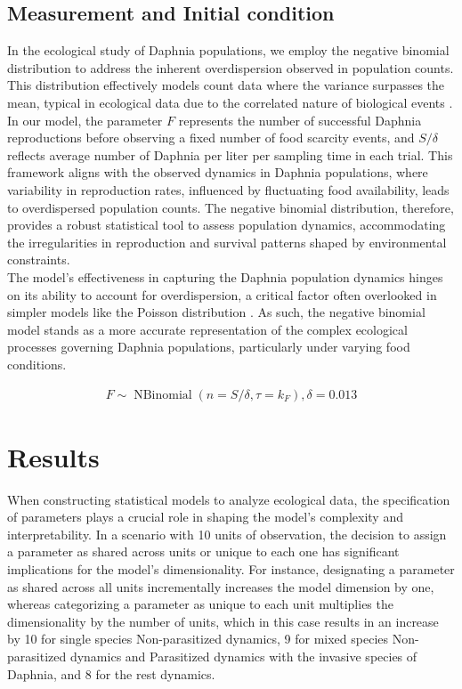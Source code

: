 \documentclass[12pt]{article}
\begin{document}
\subsection{Measurement and Initial condition}
In the ecological study of Daphnia populations, we employ the negative binomial distribution to address the inherent overdispersion observed in population counts. This distribution effectively models count data where the variance surpasses the mean, typical in ecological data due to the correlated nature of biological events \citep{ning2021systemic}. In our model, the parameter $F$ represents the number of successful Daphnia reproductions before observing a fixed number of food scarcity events, and $S / \delta$ reflects average number of Daphnia per liter per sampling time in each trial. This framework aligns with the observed dynamics in Daphnia populations, where variability in reproduction rates, influenced by fluctuating food availability, leads to overdispersed population counts. The negative binomial distribution, therefore, provides a robust statistical tool to assess population dynamics, accommodating the irregularities in reproduction and survival patterns shaped by environmental constraints.\\

The model's effectiveness in capturing the Daphnia population dynamics hinges on its ability to account for overdispersion, a critical factor often overlooked in simpler models like the Poisson distribution \citep{breto2011compound}. As such, the negative binomial model stands as a more accurate representation of the complex ecological processes governing Daphnia populations, particularly under varying food conditions.

\begin{align}
F \sim \operatorname{NBinomial}(n=S / \delta, \tau = k_F), \delta=0.013 
\end{align}

\section{Results}
\label{sec:res}
When constructing statistical models to analyze ecological data, the specification of parameters plays a crucial role in shaping the model's complexity and interpretability. In a scenario with 10 units of observation, the decision to assign a parameter as shared across units or unique to each one has significant implications for the model's dimensionality. For instance, designating a parameter as shared across all units incrementally increases the model dimension by one, whereas categorizing a parameter as unique to each unit multiplies the dimensionality by the number of units, which in this case results in an increase by 10 for single species Non-parasitized dynamics, 9 for mixed species Non-parasitized dynamics and Parasitized dynamics with the invasive species of Daphnia, and 8 for the rest dynamics.\\
\end{document}
